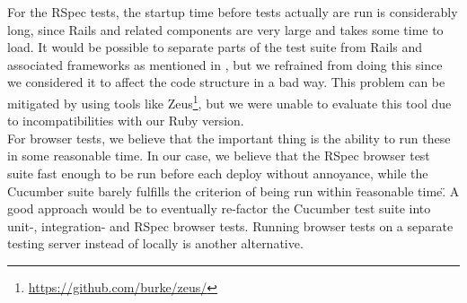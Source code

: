 For the RSpec tests, the startup time before tests actually are run is
considerably long, since Rails and related components are very large and
takes some time to load. It would be possible to separate parts of the
test suite from Rails and associated frameworks as mentioned in
, but we refrained from doing this since we
considered it to affect the code structure in a bad way. This problem
can be mitigated by using tools like
Zeus\footnote{\url{https://github.com/burke/zeus/}}, but we were unable
to evaluate this tool due to incompatibilities with our Ruby version.\\

For browser tests, we believe that the important thing is the ability to
run these in some reasonable time. In our case, we believe that the
RSpec browser test suite fast enough to be run before each deploy
without annoyance, while the Cucumber suite barely fulfills the
criterion of being run within \"reasonable time\". A good approach would
be to eventually re-factor the Cucumber test suite into unit-,
integration- and RSpec browser tests. Running browser tests on a
separate testing server instead of locally is another alternative.\\

